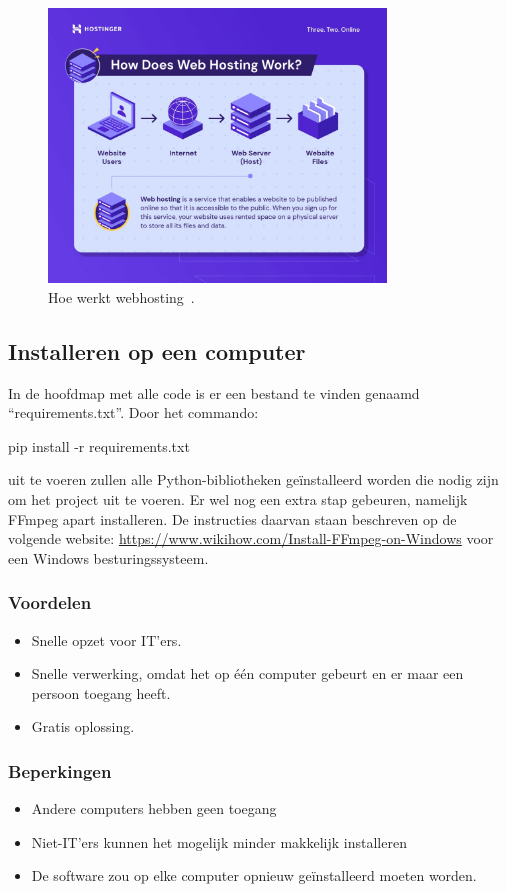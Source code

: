\begin{figure}
    \centering
    \includegraphics[width=0.8\textwidth]{./img/how-does-web-hosting-work}
    \caption{\label{fig:webhosting_scheme} Hoe werkt webhosting~\autocite{Tamara2022}.}
\end{figure}

\subsection{Installeren op een computer}
In de hoofdmap met alle code is er een bestand te vinden genaamd ``requirements.txt''. Door het commando:
\begin{python}
    pip install -r requirements.txt
\end{python}
uit te voeren zullen alle Python-bibliotheken geïnstalleerd worden die nodig zijn om het project uit te voeren. Er wel nog een extra stap gebeuren, namelijk FFmpeg apart installeren. De instructies daarvan staan beschreven op de volgende website: \url{https://www.wikihow.com/Install-FFmpeg-on-Windows} voor een Windows besturingssysteem.

\subsubsection{Voordelen}
\begin{itemize}
    \item Snelle opzet voor IT'ers.
    \item Snelle verwerking, omdat het op één computer gebeurt en er maar een persoon toegang heeft.
    \item Gratis oplossing.
\end{itemize}
\subsubsection{Beperkingen}
\begin{itemize}
    \item Andere computers hebben geen toegang
    \item Niet-IT'ers kunnen het mogelijk minder makkelijk installeren
    \item De software zou op elke computer opnieuw geïnstalleerd moeten worden.
\end{itemize}

